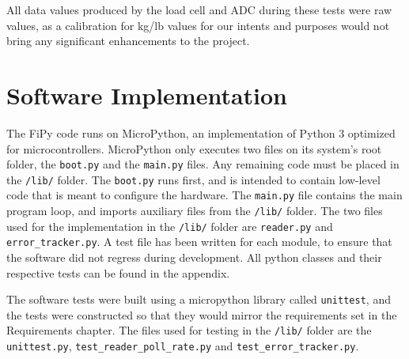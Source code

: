 All data values produced by the load cell and ADC during these tests were raw values, as a calibration for kg/lb values for our intents and purposes would not bring any significant enhancements to the project.

\section{Software Implementation}
The FiPy code runs on MicroPython, an implementation of Python 3 optimized for microcontrollers. MicroPython only executes two files on its system's root folder, the \lstinline{boot.py} and the \lstinline{main.py} files. Any remaining code must be placed in the \lstinline{/lib/} folder. The \lstinline{boot.py} runs first, and is intended to contain low-level code that is meant to configure the hardware. The \lstinline{main.py} file contains the main program loop, and imports auxiliary files from the \lstinline{/lib/} folder.
The two files used for the implementation in the \lstinline{/lib/} folder are \lstinline{reader.py} and \lstinline{error_tracker.py}. A test file has been written for each module, to ensure that the software did not regress during development. All python classes and their respective tests can be found in the appendix. 

The software tests were built using a micropython library called \lstinline{unittest}, and the tests were constructed so that they would mirror the requirements set in the Requirements chapter. The files used for testing in the \lstinline{/lib/} folder are the \lstinline{unittest.py}, \lstinline{test_reader_poll_rate.py} and \lstinline{test_error_tracker.py}.